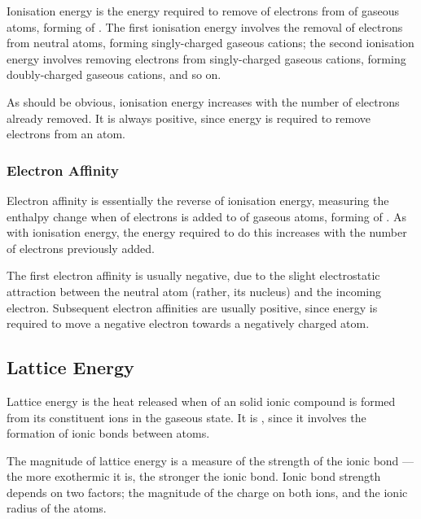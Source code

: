 				Ionisation energy is the energy required to remove  of electrons from  of gaseous atoms, forming
				 of . The first ionisation energy involves the removal of electrons from neutral atoms,
				forming singly-charged gaseous cations; the second ionisation energy involves removing electrons from singly-charged gaseous
				cations, forming doubly-charged gaseous cations, and so on.

				As should be obvious, ionisation energy increases with the number of electrons already removed. It is always positive,
				since energy is required to remove electrons from an atom.


			\subsubsection{Electron Affinity}

				Electron affinity is essentially the reverse of ionisation energy, measuring the enthalpy change when  of electrons
				is added to  of gaseous atoms, forming  of . As with ionisation energy, the energy
				required to do this increases with the number of electrons previously added.

				The first electron affinity is usually negative, due to the slight electrostatic attraction between the neutral atom (rather, its
				nucleus) and the incoming electron. Subsequent electron affinities are usually positive, since energy is required to move a negative
				electron towards a negatively charged atom.



		\subsection{Lattice Energy}

			Lattice energy is the heat released when  of an solid ionic compound is formed from its constituent ions in the
			gaseous state. It is , since it involves the formation of ionic bonds between atoms.

			The magnitude of lattice energy is a measure of the strength of the ionic bond — the more exothermic it is, the stronger the ionic bond.
			Ionic bond strength depends on two factors; the magnitude of the charge on both ions, and the ionic radius of the atoms.

